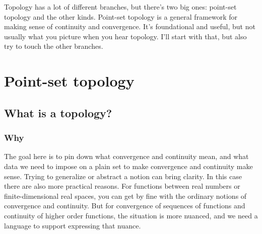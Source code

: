 \documentclass[a5paper]{scrbook}
\begin{document}
Topology has a lot of different branches, but there's two big ones: point-set topology and the other kinds. Point-set topology is a general framework for making sense of continuity and convergence. It's foundational and useful, but not usually what you picture when you hear topology. I'll start with that, but also try to touch the other branches. 
\part{Point-set topology}
\chapter{What is a topology?}
\section{Why}
The goal here is to pin down what convergence and continuity mean, and what data we need to impose on a plain set to make convergence and continuity make sense. Trying to generalize or abstract a notion can bring clarity. In this case there are also more practical reasons. For functions between real numbers or finite-dimensional real spaces, you can get by fine with the ordinary notions of convergence and continuity. But for convergence of sequences of functions and continuity of higher order functions, the situation is more nuanced, and we need a language to support expressing that nuance. 
\end{document}
